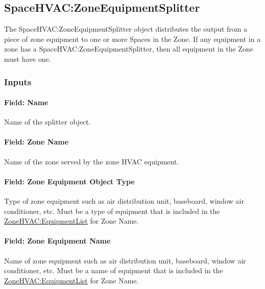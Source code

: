\subsection{SpaceHVAC:ZoneEquipmentSplitter}\label{spacehvaczoneequipmentsplitter}

The SpaceHVAC:ZoneEquipmentSplitter object distributes the output from a piece of zone equipment to one or more Spaces in the Zone.
If any equipment in a zone has a SpaceHVAC:ZoneEquipmentSplitter, then all equipment in the Zone must have one.

\subsubsection{Inputs}\label{inputs-1-052-seqsplitter}

\paragraph{Field: Name}\label{field-seqsplitter-name-015}

Name of the splitter object.

\paragraph{Field: Zone Name}\label{field-seqsplitter-zone-name}

Name of the zone served by the zone HVAC equipment.

\paragraph{Field: Zone Equipment Object Type}\label{field-seqsplitter-zone-equipment-object-type}

Type of zone equipment such as air distribution unit, baseboard, window air conditioner, etc. Must be a type of equipment
that is included in the \hyperref[zonehvacequipmentlist]{ZoneHVAC:EquipmentList} for Zone Name.

\paragraph{Field: Zone Equipment Name}\label{field-seqsplitter-zone-equipment-name}

Name of zone equipment such as air distribution unit, baseboard, window air conditioner, etc. Must be a name of equipment
that is included in the \hyperref[zonehvacequipmentlist]{ZoneHVAC:EquipmentList} for Zone Name.

